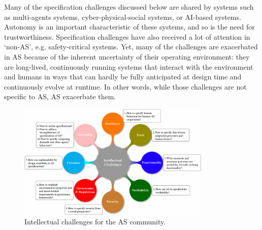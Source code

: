 \documentclass[sigconf,nonacm]{acmart}%
\begin{document}
Many of the specification challenges discussed below are shared by systems such as multi-agents systems, cyber-physical-social systems, or AI-based systems. Autonomy is an important characteristic of these systems, and so is the need for trustworthiness. Specification challenges have also received a lot of attention in ‘non-AS’, e.g. safety-critical systems. Yet, many of the challenges are exacerbated in AS because of the inherent uncertainty of their operating environment: they are long-lived, continuously running systems that interact with the environment and humans in ways that can hardly be fully anticipated at design time and continuously evolve at runtime. In other words, while those challenges are not specific to AS, AS exacerbate them. 


	\begin{figure}
	\centering
	\includegraphics[width=0.82\textwidth]{figures/Intellectual-Challenges-V3.png}\vspace{-3mm}	%
	\caption{Intellectual challenges for the AS community.}	\vspace{-1mm}
	\label{Intellectual-challenges}
\end{figure}		
\end{document}
